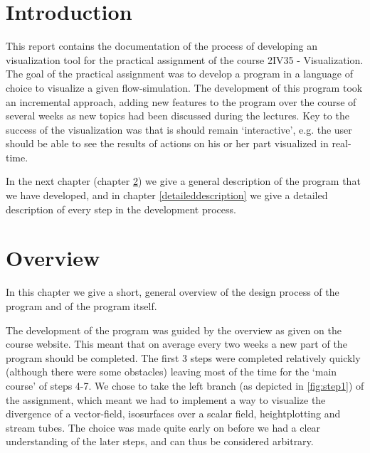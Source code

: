 \documentclass[a4paper,11pt,twoside]{report}
\begin{document}
\newcommand{\coursename}{Visualization (2IV35)}
\newcommand{\doctitle}{Practical assignment }
\newcommand{\docversion}{0.1}
\newcommand{\docdate}{\today}

\newcommand{\imagescalefactor}{0.40}
\newcommand{\cref}[1]{chapter \ref{#1}}
\newcommand{\TODO}[1]{\textsc{\textbf{TODO: #1}}}

\newcommand{\velocity}{\overrightarrow{v}}
\newcommand{\force}{\overrightarrow{F}}
\newcommand{\divv}{\textit{div}(\overrightarrow{v})}
\newcommand{\divf}{\textit{div}(\overrightarrow{F})}

\dotsspreamble

\tableofcontents

\dotssdocument

\chapter{Introduction}
	This report contains the documentation of the process of developing an visualization tool for the practical assignment of the course 2IV35 - Visualization. The goal of the practical assignment was to develop a program in a language of choice to visualize a given flow-simulation. The development of this program took an incremental approach, adding new features to the program over the course of several weeks as new topics had been discussed during the lectures. Key to the success of the visualization was that is should remain `interactive', e.g. the user should be able to see the results of actions on his or her part visualized in real-time.

	In the next chapter (\cref{overview}) we give a general description of the program that we have developed, and in \cref{detaileddescription} we give a detailed description of every step in the development process.

\chapter{Overview}\label{overview}
	In this chapter we give a short, general overview of the design process of the program and of the program itself.

	The development of the program was guided by the overview as given on the course website. This meant that on average every two weeks a new part of the program should be completed. The first 3 steps were completed relatively quickly (although there were some obstacles) leaving most of the time for the `main course' of steps 4-7. We chose to take the left branch (as depicted in \ref{fig:step1}) of the assignment, which meant we had to implement a way to visualize the divergence of a vector-field, isosurfaces over a scalar field, heightplotting and stream tubes. The choice was made quite early on before we had a clear understanding of the later steps, and can thus be considered arbitrary.
\end{document}
